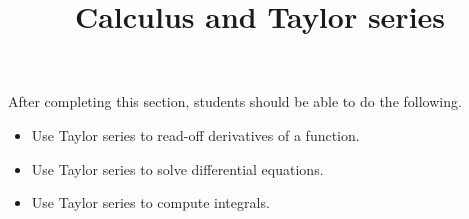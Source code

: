 \documentclass{ximera}
\title{Calculus and Taylor series}
\begin{document}
\begin{abstract}
\end{abstract}

\maketitle

\begin{sectionOutcomes}

After completing this section, students should be able to do the following.

\begin{itemize}
\item Use Taylor series to read-off derivatives of a function.
\item Use Taylor series to solve differential equations.
\item Use Taylor series to compute integrals.
\end{itemize}

\end{sectionOutcomes}
\end{document}
